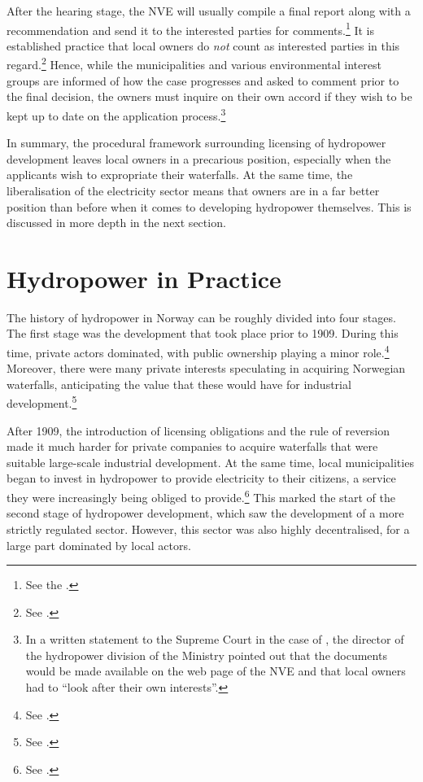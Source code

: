 After the hearing stage, the NVE will usually compile a final report along with a recommendation and send it to the interested parties for comments.\footnote{See the \dni\cite[6]{wra17}.} It is established practice that local owners do {\it not} count as interested parties in this regard.\footnote{See \cite[46]{jorpeland11}.} Hence, while the municipalities and various environmental interest groups are informed of how the case progresses and asked to comment prior to the final decision, the owners must inquire on their own accord if they wish to be kept up to date on the application process.\footnote{In a written statement to the Supreme Court in the case of \cite{jorpeland11}, the director of the hydropower division of the Ministry pointed out that the documents would be made available on the web page of the NVE and that local owners had to ``look after their own interests''.}

In summary, the procedural framework surrounding licensing of hydropower development leaves local owners in a precarious position, especially when the applicants wish to expropriate their waterfalls. At the same time, the liberalisation of the electricity sector means that owners are in a far better position than before when it comes to developing hydropower themselves. This is discussed in more depth in the next section.

\section{Hydropower in Practice}\label{sec:4:4}

The history of hydropower in Norway can be roughly divided into four stages. The first stage was the development that took place prior to 1909. During this time, private actors dominated, with public ownership playing a minor role.\footnote{See \cite{otprp61}.} Moreover, there were many private interests speculating in acquiring Norwegian waterfalls, anticipating the value that these would have for industrial development.\footnote{See \cite[30-31]{nou04}.}

After 1909, the introduction of licensing obligations and the rule of reversion made it much harder for private companies to acquire waterfalls that were suitable large-scale industrial development. At the same time, local municipalities began to invest in hydropower to provide electricity to their citizens, a service they were increasingly being obliged to provide.\footnote{See \cite{otprp61}.} This marked the start of the second stage of hydropower development, which saw the development of a more strictly regulated sector. However, this sector was also highly decentralised, for a large part dominated by local actors.

